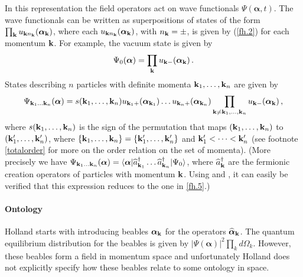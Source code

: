 \documentclass[12pt]{article}
\def\la{\langle}
\def\ra{\rangle}
\begin{document}
In this representation the field operators act on wave functionals $\Psi({\boldsymbol \alpha},t)$. The wave functionals can be written as superpositions of states of the form $\prod_{\bf k} u_{{\bf k}n_{\bf k}} ({\boldsymbol \alpha}_{\bf k})$, where each $u_{{\bf k}n_{\bf k}}({\boldsymbol \alpha}_{\bf k})$, with $n_{\bf k}=\pm$, is given by ({\ref{fh.2}}) for each momentum ${\bf k}$. For example, the vacuum state is given by 
\begin{equation}
\Psi_0({\boldsymbol \alpha}) = \prod_{\bf k} u_{{\bf k} -} ({\boldsymbol \alpha}_{\bf k})\,. 
\label{fh.4}
\end{equation}
States describing $n$ particles with definite momenta ${\bf k}_1,\dots,{\bf k}_n$ are given by
\begin{equation}
\Psi_{{\bf k}_1 \dots {\bf k}_n}({\boldsymbol \alpha}) = s({\bf k}_1,\dots,{\bf k}_n) u_{{\bf k}_1 +}  ({\boldsymbol \alpha}_{{\bf k}_1}) \dots u_{{\bf k}_n +}({\boldsymbol \alpha}_{{\bf k}_n}) \prod_{{\bf k} \neq {\bf k}_1, \dots, {\bf k}_n } u_{{\bf k} -} ({\boldsymbol \alpha}_{\bf k})\,,
\label{fh.5}
\end{equation}
where $s({\bf k}_1,\dots,{\bf k}_n)$ is the sign of the permutation that maps $({\bf k}_1,\dots,{\bf k}_n)$ to $({\bf k}'_1,\dots,{\bf k}'_n)$, where $\{{\bf k}_1,\dots,{\bf k}_n\} = \{{\bf k}'_1,\dots,{\bf k}'_n\}$ and ${\bf k}'_1 < \dots < {\bf k}'_n$ (see footnote \ref{totalorder} for more on the order relation on the set of momenta). (More precisely we have $\Psi_{{\bf k}_1 \dots {\bf k}_n}({\boldsymbol \alpha}) = \la {\boldsymbol \alpha} | {\widehat a}^\dagger_{{\bf k}_1} \dots {\widehat a}^\dagger_{{\bf k}_n} |\Psi_0 \ra$, where $ {\widehat a}^\dagger_{{\bf k}}$ are the fermionic creation operators of particles with momentum ${\bf k}$. Using \cite[pp.\ 449-457]{holland93b} and \cite{holland881}, it can easily be verified that this expression reduces to the one in \eqref{fh.5}.)


\paragraph{Ontology}
Holland starts with introducing beables ${\boldsymbol \alpha}_{\bf k}$ for the operators ${\widehat {\boldsymbol \alpha}}_{\bf k}$. The quantum equilibrium distribution for the beables is given by $|\Psi({\boldsymbol \alpha})|^2 \prod_k d \Omega_k$. However, these beables form a field in momentum space and unfortunately Holland does not explicitly specify how these beables relate to some ontology in space.
\end{document}
